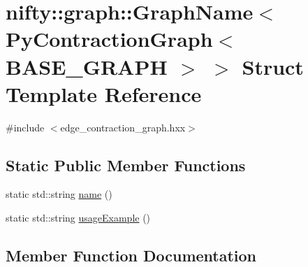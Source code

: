 \hypertarget{structnifty_1_1graph_1_1GraphName_3_01PyContractionGraph_3_01BASE__GRAPH_01_4_01_4}{}\section{nifty\+:\+:graph\+:\+:Graph\+Name$<$ Py\+Contraction\+Graph$<$ B\+A\+S\+E\+\_\+\+G\+R\+A\+P\+H $>$ $>$ Struct Template Reference}
\label{structnifty_1_1graph_1_1GraphName_3_01PyContractionGraph_3_01BASE__GRAPH_01_4_01_4}


{\ttfamily \#include $<$edge\+\_\+contraction\+\_\+graph.\+hxx$>$}

\subsection*{Static Public Member Functions}
\begin{DoxyCompactItemize}
\item 
static std\+::string \hyperlink{structnifty_1_1graph_1_1GraphName_3_01PyContractionGraph_3_01BASE__GRAPH_01_4_01_4_aeaaa5d12ae9dbe2ad7e1f69605fe9f84}{name} ()
\item 
static std\+::string \hyperlink{structnifty_1_1graph_1_1GraphName_3_01PyContractionGraph_3_01BASE__GRAPH_01_4_01_4_ac8db233096e47d4733bc569a8634eed6}{usage\+Example} ()
\end{DoxyCompactItemize}


\subsection{Member Function Documentation}
\hypertarget{structnifty_1_1graph_1_1GraphName_3_01PyContractionGraph_3_01BASE__GRAPH_01_4_01_4_aeaaa5d12ae9dbe2ad7e1f69605fe9f84}{}
